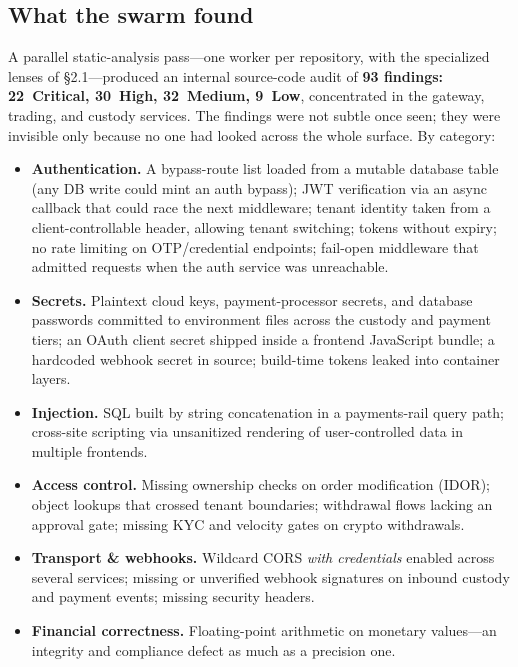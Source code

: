 \documentclass[11pt,letterpaper]{article}
\begin{document}
\subsection{What the swarm found}

A parallel static-analysis pass---one worker per repository, with the specialized
lenses of \S2.1---produced an internal source-code audit of \textbf{93 findings:
22~Critical, 30~High, 32~Medium, 9~Low}, concentrated in the gateway, trading, and
custody services. The findings were not subtle once seen; they were invisible only
because no one had looked across the whole surface. By category:

\begin{itemize}
  \item \textbf{Authentication.} A bypass-route list loaded from a mutable
  database table (any DB write could mint an auth bypass); JWT verification via an
  async callback that could race the next middleware; tenant identity taken from a
  client-controllable header, allowing tenant switching; tokens without expiry;
  no rate limiting on OTP/credential endpoints; fail-open middleware that admitted
  requests when the auth service was unreachable.
  \item \textbf{Secrets.} Plaintext cloud keys, payment-processor secrets, and
  database passwords committed to environment files across the custody and payment
  tiers; an OAuth client secret shipped inside a frontend JavaScript bundle; a
  hardcoded webhook secret in source; build-time tokens leaked into container
  layers.
  \item \textbf{Injection.} SQL built by string concatenation in a payments-rail
  query path; cross-site scripting via unsanitized rendering of user-controlled
  data in multiple frontends.
  \item \textbf{Access control.} Missing ownership checks on order modification
  (IDOR); object lookups that crossed tenant boundaries; withdrawal flows lacking
  an approval gate; missing KYC and velocity gates on crypto withdrawals.
  \item \textbf{Transport \& webhooks.} Wildcard CORS \emph{with credentials}
  enabled across several services; missing or unverified webhook signatures on
  inbound custody and payment events; missing security headers.
  \item \textbf{Financial correctness.} Floating-point arithmetic on monetary
  values---an integrity and compliance defect as much as a precision one.
\end{itemize}
\end{document}

